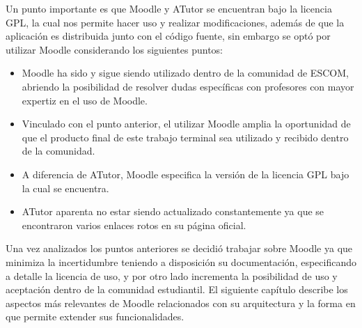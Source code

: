  \noindent Un punto importante es que Moodle y ATutor se encuentran bajo la licencia GPL,
 la cual nos permite hacer uso y realizar modificaciones, además de que la aplicación es
 distribuida junto con el código fuente, sin embargo se optó por utilizar Moodle considerando
 los siguientes puntos:

    \begin{itemize}
        \item Moodle ha sido y sigue siendo utilizado dentro de la comunidad de ESCOM,
              abriendo la posibilidad de resolver dudas específicas con profesores con
              mayor expertiz en el uso de Moodle.

        \item Vinculado con el punto anterior, el utilizar Moodle amplia la oportunidad
              de que el producto final de este trabajo terminal sea utilizado y
              recibido dentro de la comunidad.

        \item A diferencia de ATutor, Moodle especifica la versión de la licencia GPL
              bajo la cual se encuentra.

        \item ATutor aparenta no estar siendo actualizado constantemente ya que se
              encontraron varios enlaces rotos en su página oficial.
    \end{itemize}

 \noindent Una vez analizados los puntos anteriores se decidió trabajar sobre Moodle
 ya que minimiza la incertidumbre teniendo a disposición su documentación,
 especificando a detalle la licencia de uso, y por otro lado incrementa la
 posibilidad de uso y aceptación dentro de la comunidad estudiantil. El siguiente
 capítulo describe los aspectos más relevantes de Moodle relacionados con su
 arquitectura y la forma en que permite extender sus funcionalidades.




